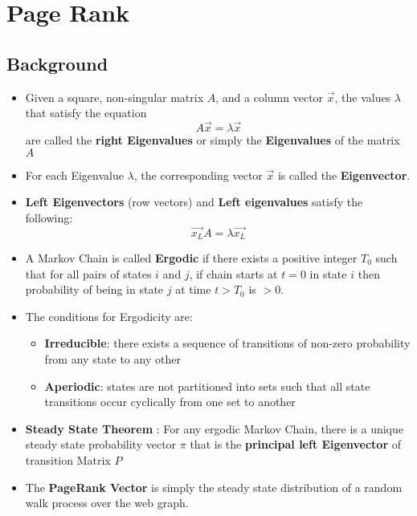 \documentclass{article}
\begin{document}
\section{Page Rank}
\subsection{Background}
\begin{itemize}
    \item Given a square, non-singular matrix $A$, and a column vector $\overrightarrow{x}$, the values $\lambda$ that satisfy the equation 
    \begin{equation*}
        A\overrightarrow{x} = \lambda \overrightarrow{x}
    \end{equation*}
    are called the \textbf{right Eigenvalues} or simply the \textbf{Eigenvalues} of the matrix $A$
    
    \item For each Eigenvalue $\lambda$, the corresponding vector $\overrightarrow{x}$ is called the \textbf{Eigenvector}. 
    
    \item \textbf{Left Eigenvectors} (row vectors) and \textbf{Left eigenvalues} satisfy the following:
    \begin{equation*}
        \overrightarrow{x_L} A = \lambda \overrightarrow{x_L}
    \end{equation*}
    
    \item A Markov Chain is called \textbf{Ergodic} if there exists a positive integer $T_0$ such that for all pairs of states $i$ and $j$, if chain starts at $t=0$ in state $i$ then probability of being in state $j$ at time $t > T_0$ is $>0$.
    
    \item The conditions for Ergodicity are:
    \begin{itemize}
        \item \textbf{Irreducible}: there exists a sequence of transitions of non-zero probability from any state to any other
        
        \item \textbf{Aperiodic}: states are not partitioned into sets such that all state transitions occur cyclically from one set to another
    \end{itemize}
    
    \item \textbf{Steady State Theorem} : For any ergodic Markov Chain, there is a unique steady state probability vector $\pi$ that is the \textbf{principal left Eigenvector} of transition Matrix $P$
    
    \item The \textbf{PageRank Vector} is simply the steady state distribution of a random walk process over the web graph. 
\end{itemize}
\end{document}
